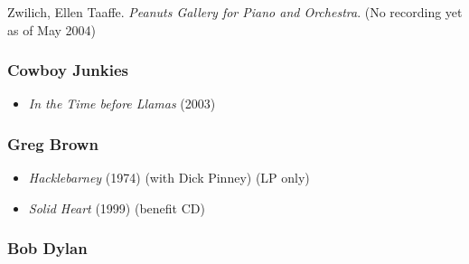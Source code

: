 \documentclass[twocolumn]{article}
\begin{document}
Zwilich, Ellen Taaffe.  \emph{Peanuts Gallery for Piano and
  Orchestra}.  (No recording yet as of May 2004)




\endgroup

\subsubsection{Cowboy Junkies}

\begin{itemize}

\item\emph{In the Time before Llamas} (2003)

\end{itemize}

\subsubsection{Greg Brown}

\begin{itemize}

\item\emph{Hacklebarney} (1974) (with Dick Pinney) (LP only)
\item\emph{Solid Heart} (1999) (benefit CD)

\end{itemize}

\subsubsection{Bob Dylan}
\end{document}
